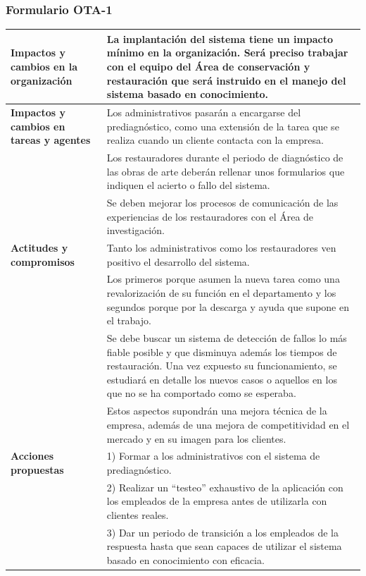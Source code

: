 \documentclass[a4paper,11pt]{article}
\begin{document}
			\subsubsection{Formulario OTA-1}
			\begin{center}
				\begin{tabular}{| p{3cm} | p{8.5cm} |}
					\hline
					\cellcolor[RGB]{224,233,250}\textbf{Impactos y cambios en la organización}
					& La implantación del sistema tiene un impacto mínimo en la organización. Será preciso trabajar
					con el equipo del Área de conservación y restauración que será instruido en
					el manejo del sistema basado en conocimiento.\\
					\hline
					\cellcolor[RGB]{224,233,250}\textbf{Impactos y cambios en tareas y agentes}
					& Los administrativos pasarán a encargarse del prediagnóstico, como una extensión de la tarea que
					se realiza cuando un cliente contacta con la empresa.\\
					\cellcolor[RGB]{224,233,250}& Los restauradores durante el periodo de
					diagnóstico de las obras de arte deberán rellenar unos formularios que indiquen el acierto o fallo del
					sistema.\\
					\cellcolor[RGB]{224,233,250}& Se deben mejorar los procesos de comunicación
					de las experiencias de los restauradores con el Área de investigación.\\
					\hline
					\cellcolor[RGB]{224,233,250}\textbf{Actitudes y compromisos} & Tanto los
					administrativos como los restauradores ven positivo el desarrollo del sistema.\\
					\cellcolor[RGB]{224,233,250}& Los primeros porque asumen la nueva tarea
					como una revalorización de su función en el departamento y los segundos porque por la descarga y ayuda que supone en el trabajo.\\
					\cellcolor[RGB]{224,233,250}& Se debe buscar un sistema de detección de
					fallos lo más fiable posible y que disminuya además los tiempos de restauración. Una vez expuesto su
					funcionamiento, se estudiará en detalle los nuevos casos o aquellos en los
					que no se ha comportado como se esperaba.\\
					\cellcolor[RGB]{224,233,250}& Estos aspectos supondrán una mejora técnica
					de la empresa, además de una mejora de competitividad en el mercado y en su imagen para los clientes.\\
					\hline
					\cellcolor[RGB]{224,233,250}\textbf{Acciones propuestas} & 1) Formar a los
					administrativos con el sistema de prediagnóstico.\\
					\cellcolor[RGB]{224,233,250}& 2) Realizar un “testeo” exhaustivo de la
					aplicación con los empleados de la empresa antes de utilizarla con clientes reales.\\
					\cellcolor[RGB]{224,233,250}& 3) Dar un periodo de transición a los
					empleados de la respuesta hasta que sean capaces de utilizar el sistema basado en conocimiento con eficacia.\\
					\hline
				\end{tabular}
			\end{center}
	\newpage
\end{document}
